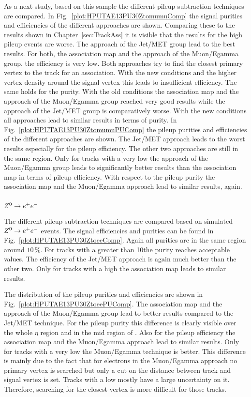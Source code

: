 As a next study, based on this sample the different pileup subtraction techniques are compared. In Fig.~\ref{plot:HPUTAE13PU30ZtomumuComp} the signal purities and efficiencies of the different approaches are shown. Comparing these to the results shown in Chapter~\ref{sec:TrackAss} it is visible that the results for the high pileup events are worse. The approach of the Jet/MET group lead to the best results. For both, the association map and the approach of the Muon/Egamma group, the efficiency is very low. Both approaches try to find the closest primary vertex to the track for an association. With the new conditions and the higher vertex density around the signal vertex this leads to insufficient efficiency. The same holds for the purity. With the old conditions the association map and the approach of the Muon/Egamma group reached very good results while the approach of the Jet/MET group is comparatively worse. With the new conditions all approaches lead to similar results in terms of purity.
In Fig.~\ref{plot:HPUTAE13PU30ZtomumuPUComp} the pileup purities and efficiencies of the different approaches are shown. The Jet/MET approach leads to the worst results especially for the pileup efficiency. The other two approaches are still in the same region. Only for tracks with a very low \pt the approach of the Muon/Egamma group leads to significantly better results than the association map in terms of pileup efficiency. With respect to the pileup purity the association map and the Muon/Egamma approach lead to similar results, again.

\subsubsection{${Z^{0}}\rightarrow e^+e^-$ \label{sec:HPUTAE13PU30Ztoee}}

The different pileup subtraction techniques are compared based on simulated ${Z^{0}}\rightarrow e^+e^-$ events. The signal efficiencies and purities can be found in Fig.~\ref{plot:HPUTAE13PU30ZtoeeComp}. Again all purities are in the same region around $10\,\%$. For tracks with a \pt greater than 10\GeV the purity reaches acceptable values. The efficiency of the Jet/MET approach is again much better than the other two. Only for tracks with a high \pt the association map leads to similar results.

The distribution of the pileup purities and efficiencies are shown in Fig.~\ref{plot:HPUTAE13PU30ZtoeePUComp}. The association map and the approach of the Muon/Egamma group lead to better results compared to the Jet/MET technique. For the pileup purity this difference is clearly visible over the whole $\eta$ region and in the mid region of \pt{}. Also for the pileup efficiency the association map and the Muon/Egamma approach lead to similar results. Only for tracks with a very low \pt the Muon/Egamma technique is better. This difference is mainly due to the fact that for electrons in the Muon/Egamma approach no primary vertex is searched but only a cut on the distance between track and signal vertex is set. Tracks with a low \pt mostly have a large uncertainty on it. Therefore, searching for the closest vertex is more difficult for those tracks.

